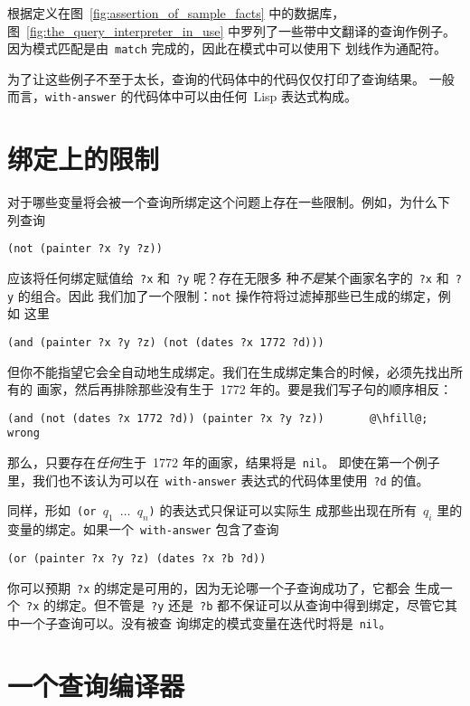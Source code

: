 根据定义在图~\ref{fig:assertion_of_sample_facts} 中的数据库，
图~\ref{fig:the_query_interpreter_in_use} 中罗列了一些带中文翻译的查询作例子。
因为模式匹配是由~\texttt{match} 完成的，因此在模式中可以使用下
划线作为通配符。

为了让这些例子不至于太长，查询的代码体中的代码仅仅打印了查询结果。
一般而言，\texttt{with-answer} 的代码体中可以由任何~Lisp 表达式构成。

\section{绑定上的限制}
\label{sec:restrictions_on_binding}

对于哪些变量将会被一个查询所绑定这个问题上存在一些限制。例如，为什么下
列查询
\begin{lstlisting}
(not (painter ?x ?y ?z))
\end{lstlisting}
应该将任何绑定赋值给~\texttt{?x} 和~\texttt{?y} 呢？存在无限多
种\emph{不是}某个画家名字的~\texttt{?x} 和~\texttt{?y} 的组合。因此
我们加了一个限制：\texttt{not} 操作符将过滤掉那些已生成的绑定，例如
这里
\begin{lstlisting}
(and (painter ?x ?y ?z) (not (dates ?x 1772 ?d)))
\end{lstlisting}
但你不能指望它会全自动地生成绑定。我们在生成绑定集合的时候，必须先找出所有的
画家，然后再排除那些没有生于~1772 年的。要是我们写子句的顺序相反：
\begin{lstlisting}[escapechar=\@]
(and (not (dates ?x 1772 ?d)) (painter ?x ?y ?z))       @\hfill@; wrong
\end{lstlisting}
那么，只要存在\emph{任何}生于~1772 年的画家，结果将是~\texttt{nil}。
即使在第一个例子里，我们也不该认为可以在~\texttt{with-answer} 表达式的代码体里使用~\texttt{?d} 的值。

同样，形如~\texttt{(or $q_1$ $\ldots$ $q_n$)} 的表达式只保证可以实际生
成那些出现在所有~$q_i$ 里的变量的绑定。如果一个~\texttt{with-answer}
包含了查询
\begin{lstlisting}
(or (painter ?x ?y ?z) (dates ?x ?b ?d))
\end{lstlisting}
你可以预期~\verb|?x| 的绑定是可用的，因为无论哪一个子查询成功了，它都会
生成一个~\texttt{?x} 的绑定。但不管是~\texttt{?y} 还是~\texttt{?b}
都不保证可以从查询中得到绑定，尽管它其中一个子查询可以。没有被查
询绑定的模式变量在迭代时将是~\texttt{nil}。

\section{一个查询编译器}
\label{sec:a_query_compiler}

